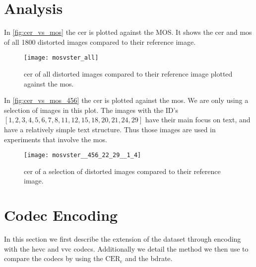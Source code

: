 \section{Analysis}
\label{sec:dataset_analysis}

In \autoref{fig:cer_vs_mos} the cer is plotted against the MOS.
It shows the \gls{cer} and \gls{mos} of all 1800 distorted images compared to their reference image.

\begin{figure}[h]
    \centering
    \texttt{[image: mosvster\_all]}
    \caption{\gls{cer} of all distorted images compared to their reference image plotted against the \gls{mos}.}
    \label{fig:cer_vs_mos}
\end{figure}

In \autoref{fig:cer_vs_mos_456} the \gls{cer} is plotted against the \gls{mos}.
We are only using a selection of images in this plot.
The images with the ID's $[1, 2, 3, 4, 5, 6, 7, 8, 11, 12, 15, 18, 20, 21, 24, 29]$ have their main focus on text, and have a relatively simple text structure.
Thus those images are used in experiments that involve the \gls{mos}.


\begin{figure}[h]
    \centering
    \texttt{[image: mosvster\_\_456\_22\_29\_\_1\_4]}
    \caption{\gls{cer} of a selection of distorted images compared to their reference image.}
    \label{fig:cer_vs_mos_456}
\end{figure}

\section{Codec Encoding}
\label{sec:dataset_codec}

In this section we first describe the extension of the dataset through encoding with the \gls{hevc} and \gls{vvc} codecs.
Additionally we detail the method we then use to compare the codecs by using the $\text{CER}_{\text{c}}$ and the \gls{bdrate}.

